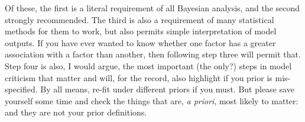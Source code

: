 \documentclass[12pt]{report}
\begin{document}
Of these, the first is a literal requirement of all Bayesian analysis, and the second strongly recommended. The third is also a requirement of many statistical methods for them to work, but also permits simple interpretation of model outputs. If you have ever wanted to know whether one factor has a greater association with a factor than another, then following step three will permit that. Step four is also, I would argue, the most important (the only?) steps in model criticism that matter and will, for the record, also highlight if you prior is mis-specified. By all means, re-fit under different priors if you must. But please save yourself some time and check the things that are, \emph{a priori}, most likely to matter: and they are not your prior definitions.

\clearpage
\renewcommand\bibname{References}
\printbibliography
\end{document}
